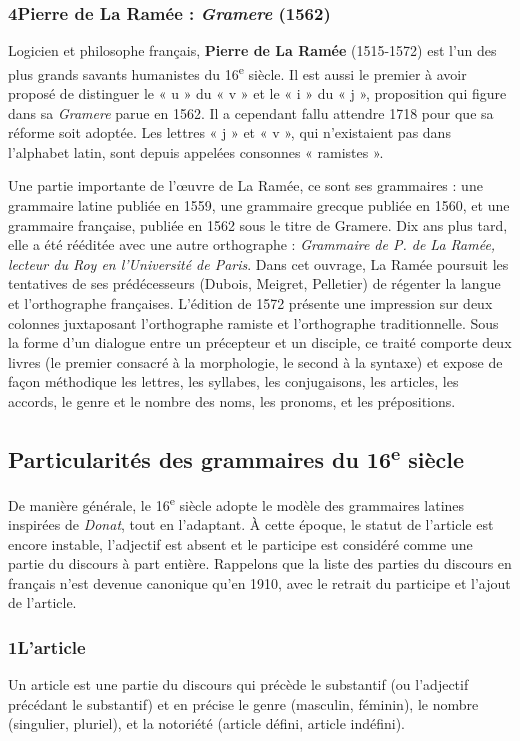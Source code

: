 \subsubsection*{4\quad Pierre de La Ramée : \textit{Gramere} (1562)}
Logicien et philosophe français, \textbf{Pierre de La Ramée} (1515-1572) est l’un des plus grands savants humanistes du 16\textsuperscript{e} siècle. Il est aussi le premier à avoir proposé de distinguer le « u » du « v » et le « i » du « j », proposition qui figure dans sa \textit{Gramere} parue en 1562. Il a cependant fallu attendre 1718 pour que sa réforme soit adoptée. Les lettres « j » et « v », qui n’existaient pas dans l’alphabet latin, sont depuis appelées consonnes « ramistes ».

Une partie importante de l’œuvre de La Ramée, ce sont ses grammaires : une grammaire latine publiée en 1559, une grammaire grecque publiée en 1560, et une grammaire française, publiée en 1562 sous le titre de Gramere. Dix ans plus tard, elle a été rééditée avec une autre orthographe : \textit{Grammaire de P. de La Ramée, lecteur du Roy en l’Université de Paris}. Dans cet ouvrage, La Ramée poursuit les tentatives de ses prédécesseurs (Dubois, Meigret, Pelletier) de régenter la langue et l’orthographe françaises. L’édition de 1572 présente une impression sur deux colonnes juxtaposant l’orthographe ramiste et l’orthographe traditionnelle. Sous la forme d’un dialogue entre un précepteur et un disciple, ce traité comporte deux livres (le premier consacré à la morphologie, le second à la syntaxe) et expose de façon méthodique les lettres, les syllabes, les conjugaisons, les articles, les accords, le genre et le nombre des noms, les pronoms, et les prépositions.
\subsection{Particularités des grammaires du 16\textsuperscript{e} siècle}
De manière générale, le 16\textsuperscript{e} siècle adopte le modèle des grammaires latines inspirées de \textit{Donat}, tout en l’adaptant. À cette époque, le statut de l’article est encore instable, l’adjectif est absent et le participe est considéré comme une partie du discours à part entière. Rappelons que la liste des parties du discours en français n’est devenue canonique qu’en 1910, avec le retrait du participe et l’ajout de l’article.
\subsubsection*{1\quad L’article}
Un article est une partie du discours qui précède le substantif (ou l’adjectif précédant le substantif) et en précise le genre (masculin, féminin), le nombre (singulier, pluriel), et la notoriété (article défini, article indéfini).


